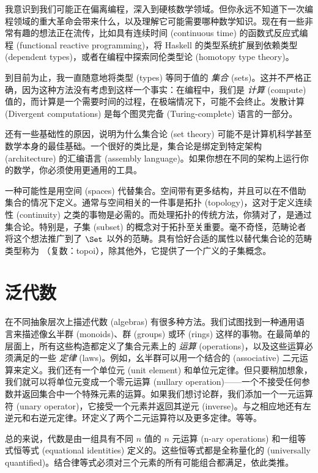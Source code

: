 
\lettrine[lhang=0.17]{我}{意识到我们可能}正在偏离编程，深入到硬核数学领域。但你永远不知道下一次编程领域的重大革命会带来什么，以及理解它可能需要哪种数学知识。现在有一些非常有趣的想法正在流传，比如具有连续时间 (continuous time) 的函数式反应式编程 (functional reactive programming)，将 Haskell 的类型系统扩展到依赖类型 (dependent types)，或者在编程中探索同伦类型论 (homotopy type theory)。

到目前为止，我一直随意地将类型 (types) 等同于值的 \emph{集合} (sets)。这并不严格正确，因为这种方法没有考虑到这样一个事实：在编程中，我们是 \emph{计算} (compute) 值的，而计算是一个需要时间的过程，在极端情况下，可能不会终止。发散计算 (Divergent computations) 是每个图灵完备 (Turing-complete) 语言的一部分。

还有一些基础性的原因，说明为什么集合论 (set theory) 可能不是计算机科学甚至数学本身的最佳基础。一个很好的类比是，集合论是绑定到特定架构 (architecture) 的汇编语言 (assembly language)。如果你想在不同的架构上运行你的数学，你必须使用更通用的工具。

一种可能性是用空间 (spaces) 代替集合。空间带有更多结构，并且可以在不借助集合的情况下定义。通常与空间相关的一件事是拓扑 (topology)，这对于定义连续性 (continuity) 之类的事物是必需的。而处理拓扑的传统方法，你猜对了，是通过集合论。特别是，子集 (subset) 的概念对于拓扑至关重要。毫不奇怪，范畴论者将这个想法推广到了 $\Set$ 以外的范畴。具有恰好合适的属性以替代集合论的范畴类型称为 （复数：topoi），除其他外，它提供了一个广义的子集概念。

\section{泛代数}

在不同抽象层次上描述代数 (algebras) 有很多种方法。我们试图找到一种通用语言来描述像幺半群 (monoids)、群 (groups) 或环 (rings) 这样的事物。在最简单的层面上，所有这些构造都定义了集合元素上的 \emph{运算} (operations)，以及这些运算必须满足的一些 \emph{定律} (laws)。例如，幺半群可以用一个结合的 (associative) 二元运算来定义。我们还有一个单位元 (unit element) 和单位元定律。但只要稍加想象，我们就可以将单位元变成一个零元运算 (nullary operation)——一个不接受任何参数并返回集合中一个特殊元素的运算。如果我们想讨论群，我们添加一个一元运算符 (unary operator)，它接受一个元素并返回其逆元 (inverse)。与之相应地还有左逆元和右逆元定律。环定义了两个二元运算符以及更多定律。等等。

总的来说，代数是由一组具有不同 $n$ 值的 $n$ 元运算 (n-ary operations) 和一组等式恒等式 (equational identities) 定义的。这些恒等式都是全称量化的 (universally quantified)。结合律等式必须对三个元素的所有可能组合都满足，依此类推。


